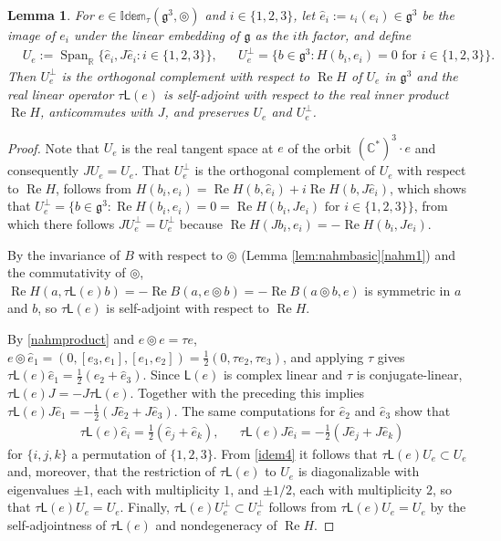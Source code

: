 \documentclass[leqno,10pt]{amsart}
\newtheorem{lemma}[theorem]{Lemma}%
\theoremstyle{definition}
\numberwithin{equation}{section}
\newcommand{\idem}{\mathbb{Idem}}
\newcommand{\tmlt}{\circledcirc}
\newcommand{\lin}{\mathsf{L}}
\newcommand{\re}{\operatorname{Re}}
\newcommand{\spn}{\operatorname{Span}}
\newcommand{\g}{\mathfrak{g}}
\newcommand{\rea}{\mathbb R}
\newcommand{\com}{\mathbb C}
\newcommand{\Usp}{U}
\newcommand{\Uperp}{\Usp^{\perp}}
\begin{document}
\begin{lemma}\label{hess2}
For $e \in \idem_{\tau}(\g^{3}, \tmlt)$ and $i \in \{1, 2, 3\}$, let $\hat{e}_{i} := \iota_{i}(e_{i}) \in \g^{3}$ be the image of $e_{i}$ under the linear embedding of $\g$ as the $i$th factor, and define
\begin{align}\label{eq:UR}
&\Usp_{e} := \spn_{\rea}\{\hat{e}_{i}, J\hat{e}_{i}: i \in \{1, 2, 3\}\}, &
&\Uperp_{e} = \{b \in \g^{3}: H(b_{i}, e_{i}) = 0 \text{ for } i \in \{1, 2, 3\}\}.
\end{align}
Then $\Uperp_{e}$ is the orthogonal complement with respect to $\re H$ of $\Usp_{e}$ in $\g^3$ and the real linear operator $\tau\lin(e)$ is self-adjoint with respect to the real inner product $\re H$, anticommutes with $J$, and preserves $\Usp_{e}$ and $\Uperp_{e}$.
\end{lemma}
\begin{proof}
Note that $\Usp_{e}$ is the real tangent space at $e$ of the orbit $(\com^{\ast})^{3}\cdot e$ and consequently $J\Usp_{e} = \Usp_{e}$. That $\Uperp_{e}$ is the orthogonal complement of $\Usp_{e}$ with respect to $\re H$, follows from $H(b_{i}, e_{i}) = \re H(b, \hat{e}_{i}) + i\re H(b, J\hat{e}_{i})$, which shows that $\Uperp_{e} = \{b \in \g^{3}: \re H(b_{i}, e_{i}) = 0 = \re H(b_{i}, Je_{i}) \text{ for } i \in \{1, 2, 3\}\}$, from which there follows $J\Uperp_{e} = \Uperp_{e}$ because $\re H(Jb_{i}, e_{i}) = - \re H(b_{i}, Je_{i})$.

By the invariance of $B$ with respect to $\tmlt$ (Lemma \ref{lem:nahmbasic}\ref{nahm1}) and the commutativity of $\tmlt$, $\re H(a, \tau\lin(e)b) = -\re B(a, e \tmlt b) = -\re B(a\tmlt b, e)$ is symmetric in $a$ and $b$, so $\tau\lin(e)$ is self-adjoint with respect to $\re H$.

By \eqref{nahmproduct} and $e \tmlt e = \tau e$, $e \tmlt \hat{e}_{1} = (0, [e_{3}, e_{1}], [e_{1}, e_{2}]) = \tfrac{1}{2}(0, \tau e_{2}, \tau e_{3})$, and applying $\tau$ gives $\tau\lin(e)\hat{e}_{1} = \tfrac{1}{2}(\hat{e}_{2} + \hat{e}_{3})$. Since $\lin(e)$ is complex linear and $\tau$ is conjugate-linear, $\tau\lin(e)J = -J\tau\lin(e)$. Together with the preceding this implies $\tau\lin(e)J\hat{e}_{1} = -\tfrac{1}{2}(J\hat{e}_{2} + J\hat{e}_{3})$. The same computations for $\hat{e}_{2}$ and $\hat{e}_{3}$ show that
\begin{align}\label{idem4}
&\tau\lin(e)\hat{e}_{i} = \tfrac{1}{2}(\hat{e}_{j} + \hat{e}_{k}), && \tau\lin(e)J\hat{e}_{i} = -\tfrac{1}{2}(J\hat{e}_{j} + J\hat{e}_{k})
\end{align}
for $\{i, j, k\}$ a permutation of $\{1, 2, 3\}$. From \eqref{idem4} it follows that $\tau\lin(e)\Usp_{e} \subset \Usp_{e}$ and, moreover, that the restriction of $\tau \lin(e)$ to $\Usp_{e}$ is diagonalizable with eigenvalues $\pm 1$, each with multiplicity $1$, and $\pm 1/2$, each with multiplicity $2$, so that $\tau\lin(e)\Usp_{e} = \Usp_{e}$.
Finally, $\tau\lin(e)\Uperp_{e} \subset \Uperp_{e}$ follows from $\tau \lin(e)\Usp_{e} = \Usp_{e}$ by the self-adjointness of $\tau\lin(e)$ and nondegeneracy of $\re H$.
\end{proof}
\end{document}
